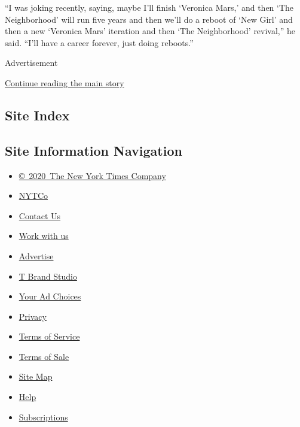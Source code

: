 ``I was joking recently, saying, maybe I'll finish `Veronica Mars,' and
then `The Neighborhood' will run five years and then we'll do a reboot
of `New Girl' and then a new `Veronica Mars' iteration and then `The
Neighborhood' revival,'' he said. ``I'll have a career forever, just
doing reboots.''

Advertisement

\protect\hyperlink{after-bottom}{Continue reading the main story}

\hypertarget{site-index}{%
\subsection{Site Index}\label{site-index}}

\hypertarget{site-information-navigation}{%
\subsection{Site Information
Navigation}\label{site-information-navigation}}

\begin{itemize}
\tightlist
\item
  \href{https://help.nytimes.com/hc/en-us/articles/115014792127-Copyright-notice}{©~2020~The
  New York Times Company}
\end{itemize}

\begin{itemize}
\tightlist
\item
  \href{https://www.nytco.com/}{NYTCo}
\item
  \href{https://help.nytimes.com/hc/en-us/articles/115015385887-Contact-Us}{Contact
  Us}
\item
  \href{https://www.nytco.com/careers/}{Work with us}
\item
  \href{https://nytmediakit.com/}{Advertise}
\item
  \href{http://www.tbrandstudio.com/}{T Brand Studio}
\item
  \href{https://www.nytimes.com/privacy/cookie-policy\#how-do-i-manage-trackers}{Your
  Ad Choices}
\item
  \href{https://www.nytimes.com/privacy}{Privacy}
\item
  \href{https://help.nytimes.com/hc/en-us/articles/115014893428-Terms-of-service}{Terms
  of Service}
\item
  \href{https://help.nytimes.com/hc/en-us/articles/115014893968-Terms-of-sale}{Terms
  of Sale}
\item
  \href{https://spiderbites.nytimes.com}{Site Map}
\item
  \href{https://help.nytimes.com/hc/en-us}{Help}
\item
  \href{https://www.nytimes.com/subscription?campaignId=37WXW}{Subscriptions}
\end{itemize}
